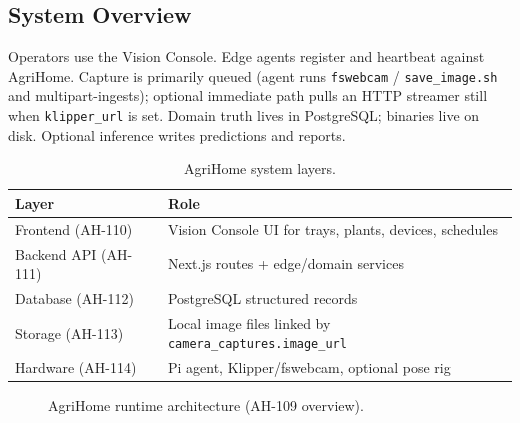 \documentclass[11pt,letterpaper]{article}
\begin{document}
\subsection{System Overview}
Operators use the Vision Console. Edge agents register and heartbeat against AgriHome.
Capture is primarily queued (agent runs \texttt{fswebcam} / \texttt{save\_image.sh} and
multipart-ingests); optional immediate path pulls an HTTP streamer still when \texttt{klipper\_url} is set. Domain truth lives in PostgreSQL; binaries live on disk. Optional
inference writes predictions and reports.

\begin{table}[H]
\centering
\begin{tabular}{@{}p{4.2cm}p{9.5cm}@{}}
\toprule
\textbf{Layer} & \textbf{Role} \\
\midrule
Frontend (AH-110) & Vision Console UI for trays, plants, devices, schedules \\
Backend API (AH-111) & Next.js routes + edge/domain services \\
Database (AH-112) & PostgreSQL structured records \\
Storage (AH-113) & Local image files linked by \texttt{camera\_captures.image\_url} \\
Hardware (AH-114) & Pi agent, Klipper/fswebcam, optional pose rig \\
\bottomrule
\end{tabular}
\caption{AgriHome system layers.}
\label{tab:layers}
\end{table}

\begin{figure}[H]
\centering
{}
\caption{AgriHome runtime architecture (AH-109 overview).}
\label{fig:dds-overview}
\end{figure}
\end{document}
